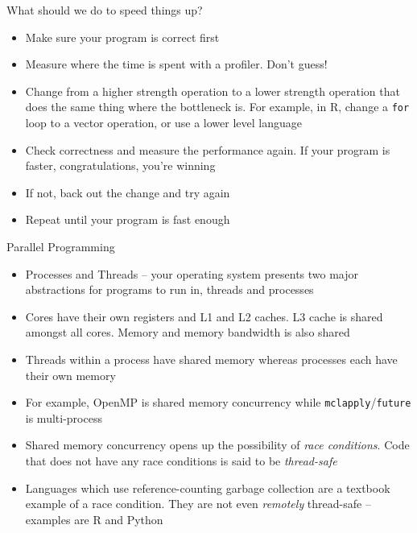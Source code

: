 \documentclass{beamer}
\begin{document}
\begin{frame}{What should we do to speed things up?}
	\begin{itemize}
		\item Make sure your program is correct first
		\item Measure where the time is spent with a profiler. Don't guess!
		\item Change from a higher strength operation to a lower strength operation that does the same thing where the bottleneck is. For example, in R, change a \texttt{for} loop to a vector operation, or use a lower level language
		\item Check correctness and measure the performance again. If your program is faster, congratulations, you're winning
		\item If not, back out the change and try again
		\item Repeat until your program is fast enough
	\end{itemize}

\end{frame}

\begin{frame}{Parallel Programming}
	\begin{itemize}
		\item Processes and Threads -- your operating system presents two major abstractions for programs to run in, threads and processes
		\item Cores have their own registers and L1 and L2 caches. L3 cache is shared amongst all cores. Memory and memory bandwidth is also shared
		\item Threads within a process have shared memory whereas processes each have their own memory
		\item For example, OpenMP is shared memory concurrency while \texttt{mclapply}/\texttt{future} is multi-process
		\item Shared memory concurrency opens up the possibility of \emph{race conditions}. Code that does not have any race conditions is said to be \emph{thread-safe}
		\item Languages which use reference-counting garbage collection are a textbook example of a race condition. They are not even \emph{remotely} thread-safe -- examples are R and Python
	\end{itemize}
\end{frame}
\end{document}
